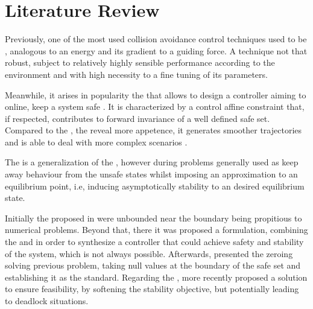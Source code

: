 \section{Literature Review}
\label{sec:Literature_Review}


Previously, one of the most used collision avoidance control techniques used to be  \cite{krogh1984generalized, khatib1986real}, analogous to an energy and its gradient to a guiding force. A technique not that robust, subject to relatively highly sensible performance according to the environment and with high necessity to a fine tuning of its parameters. 

Meanwhile, it arises in popularity the  that allows to design a controller aiming to online, keep a system safe \cite{ames2019control}. It is characterized by a control affine constraint that, if respected, contributes to forward invariance of a well defined safe set. Compared to the , the  reveal more appetence, it generates smoother trajectories and is able to deal with more complex scenarios \cite{singletary2021comparative}.

The  is a generalization of the  \cite{sontag1983lyapunov, ames2014rapidly}, however during problems generally used as keep away behaviour from the unsafe states whilst  imposing an approximation to an equilibrium point, i.e, inducing asymptotically stability to an desired equilibrium state. 

Initially the  proposed in \cite{ames2014control} were unbounded near the boundary being propitious to numerical problems. Beyond that, there it was proposed a  formulation, combining the  and  in order to synthesize a controller that could achieve safety and stability of the system, which is not always possible.  Afterwards, \cite{xu2015robustness} presented the zeroing  solving previous problem, taking null values at the boundary of the safe set and establishing it as the standard. Regarding the , more recently \cite{ames2019control} proposed a solution to ensure feasibility, by softening the stability objective, but potentially leading to deadlock situations.




